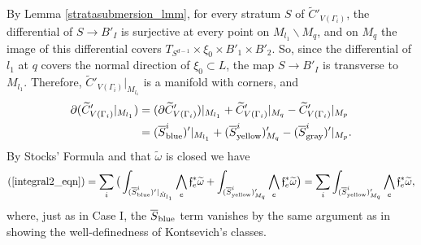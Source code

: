 \documentclass[11pt]{article}
\theoremstyle{definition}
\theoremstyle{remark}
\def\wt#1{\widetilde{#1}}
\def\ov#1{\overline{#1}}
\def\mr#1{{\mathring{#1}}}
\def\sgray{{\textnormal{gray}}}
\def\syellow{{\textnormal{yellow}}}
\def\sblue{{\textnormal{blue}}}
\def\ff{\mathfrak{f}}
\begin{document}
By Lemma \ref{stratasubmersion_lmm}, for every stratum $S$ of $\wt{C}'_{V(\Gamma_i)}$, the differential of  $S\to B'_I$ is surjective at every point on $M_{l_1}\backslash M_q$, and on $M_q$ the image of this differential covers $T_{S^{d-1}}\times\xi_0\times B'_1\times B'_2$. So, since the differential of $l_1$ at $q$ covers the normal direction of $\xi_0\subset L$, the map $S\to B'_I$ is transverse to $M_{l_1}$. 
Therefore, $\wt{C}'_{V(\Gamma_i)}|_{M_{l_1}}$ is a manifold with corners, and 
\begin{align*}
\partial(\wt{C}'_{V(\Gamma_i)}|_{M_{l_1}})&=
(\partial\wt{C}'_{V(\Gamma_i)})|_{{M}_{l_1}}+ \wt{C}'_{V(\Gamma_i)}|_{M_{q}}-\wt{C}'_{V(\Gamma_i)}|_{M_{p}}\\
&=(\ov{S}_{\sblue}^i)'|_{{M}_{l_1}}+(\ov{S}_{\syellow}^i)'_{M_q}-(\ov{S}_{\sgray}^i)'|_{M_p}.
\end{align*}
By Stocks' Formula and that $\wt\omega$ is closed we have
\begin{equation}\label{stocks3_eqn}
(\ref{integral2_eqn})=\sum_i\big(\int_{(\ov{S}_{\sblue}^i)'|_{\mr{M}_{l_1}}}\bigwedge_e\ff_e^*\wt\omega+\int_{(\ov{S}_{\syellow}^i)'_{M_q}}\bigwedge_e\ff_e^*\wt\omega\big)=\sum_i\int_{(\ov{S}_{\syellow}^i)'_{M_q}}\bigwedge_e\ff_e^*\wt\omega,
\end{equation}
where, just as in Case I, the $\ov{S}_{\sblue}$ term vanishes by the same argument as in showing the well-definedness of Kontsevich's classes.  
\end{document}
